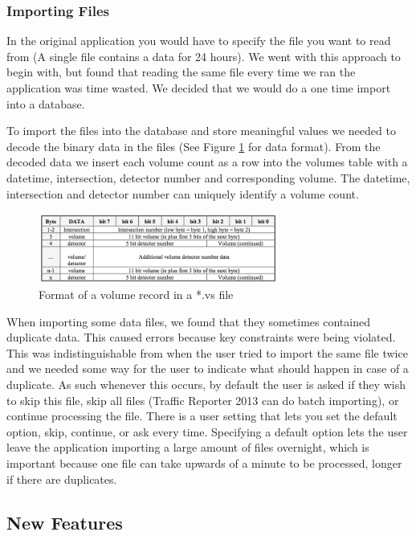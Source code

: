 \documentclass{article}
\begin{document}
\subsubsection{Importing Files}
In the original application you would have to specify the file you want to read from (A single file contains a data for 24 hours). We went with this approach to begin with, but found that reading the same file every time we ran the application was time wasted. We decided that we would do a one time import into a database.

To import the files into the database and store meaningful values we needed to decode the binary data in the files (See Figure \ref{fig:vsDataFormat} for data format). From the decoded data we insert each volume count as a row into the volumes table with a datetime, intersection, detector number and corresponding volume. The datetime, intersection and detector number can uniquely identify a volume count.

\begin{figure}[!b]
\centerline{\includegraphics[width=3.1in]{volumeDataFormat}}
\caption{Format of a volume record in a *.vs file}
\label{fig:vsDataFormat}
\end{figure}

When importing some data files, we found that they sometimes contained duplicate data. This caused errors because key constraints were being violated. This was indistinguishable from when the user tried to import the same file twice and we needed some way for the user to indicate what should happen in case of a duplicate. As such whenever this occurs, by default the user is asked if they wish to skip this file, skip all files (Traffic Reporter 2013 can do batch importing), or continue processing the file. There is a user setting that lets you set the default option, skip, continue, or ask every time. Specifying a default option lets the user leave the application importing a large amount of files overnight, which is important because one file can take upwards of a minute to be processed, longer if there are duplicates.

\subsection{New Features}
\end{document}
